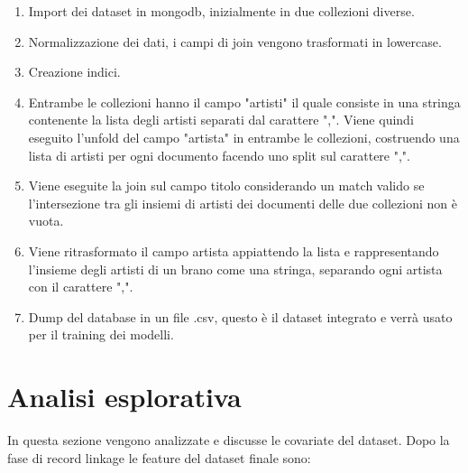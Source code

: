 \begin{enumerate}
	\item Import dei dataset in mongodb, inizialmente in due collezioni diverse.
	\item Normalizzazione dei dati, i campi di join vengono trasformati in lowercase.
	\item Creazione indici.
	\item Entrambe le collezioni hanno il campo "artisti" il quale consiste in una stringa contenente la lista degli artisti separati dal carattere ",". Viene quindi eseguito l'unfold del campo "artista" in entrambe le collezioni, costruendo una lista di artisti per ogni documento facendo uno split sul carattere ",".
	\item Viene eseguite la join sul campo titolo considerando un match valido se l'intersezione tra gli insiemi di artisti dei documenti delle due collezioni non è vuota.
	\item Viene ritrasformato il campo artista appiattendo la lista e rappresentando l'insieme degli artisti di un brano come una stringa, separando ogni artista con il carattere ",".
	\item Dump del database in un file .csv, questo è il dataset integrato e verrà usato per il training dei modelli.
\end{enumerate}

\section{Analisi esplorativa}
In questa sezione vengono analizzate e discusse le covariate del dataset. Dopo la fase di record linkage le feature del dataset finale sono:

